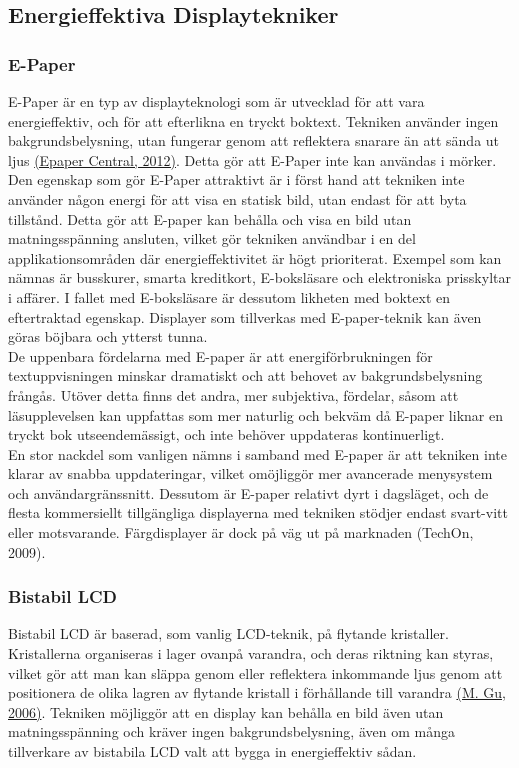 \documentclass[a4paper,11pt]{article}
\begin{document}
\subsection{Energieffektiva Displaytekniker}

\subsubsection{E-Paper}
E-Paper är en typ av displayteknologi som är utvecklad för att vara energieffektiv, och för att efterlikna en tryckt boktext. Tekniken använder ingen bakgrundsbelysning, utan fungerar genom att reflektera snarare än att sända ut ljus \hyperref[epapercentral]{(Epaper Central, 2012)}. Detta gör att E-Paper inte kan användas i mörker. Den egenskap som gör E-Paper attraktivt är i först hand att tekniken inte använder någon energi för att visa en statisk bild, utan endast för att byta tillstånd. Detta gör att E-paper kan behålla och visa en bild utan matningsspänning ansluten, vilket gör tekniken användbar i en del applikationsområden där energieffektivitet är högt prioriterat. Exempel som kan nämnas är busskurer, smarta kreditkort, E-boksläsare och elektroniska prisskyltar i affärer. I fallet med E-boksläsare är dessutom likheten med boktext en eftertraktad egenskap. Displayer som tillverkas med E-paper-teknik kan även göras böjbara och ytterst tunna. \\

De uppenbara fördelarna med E-paper är att energiförbrukningen för textuppvisningen minskar dramatiskt och att behovet av bakgrundsbelysning frångås. Utöver detta finns det andra, mer subjektiva, fördelar, såsom att läsupplevelsen kan uppfattas som mer naturlig och bekväm då E-paper liknar en tryckt bok utseendemässigt, och inte behöver uppdateras kontinuerligt. \\

En stor nackdel som vanligen nämns i samband med E-paper är att tekniken inte klarar av snabba uppdateringar, vilket omöjliggör mer avancerade menysystem och användargränssnitt. Dessutom är E-paper relativt dyrt i dagsläget, och de flesta kommersiellt tillgängliga displayerna med tekniken stödjer endast svart-vitt eller motsvarande. Färgdisplayer är dock på väg ut på marknaden (TechOn, 2009).

\subsubsection{Bistabil LCD}
Bistabil LCD är baserad, som vanlig LCD-teknik, på flytande kristaller. Kristallerna organiseras i lager ovanpå varandra, och deras riktning kan styras, vilket gör att man kan släppa genom eller reflektera inkommande ljus genom att positionera de olika lagren av flytande kristall i förhållande till varandra \hyperref[mingu]{(M. Gu, 2006)}. Tekniken möjliggör att en display kan behålla en bild även utan matningsspänning och kräver ingen bakgrundsbelysning, även om många tillverkare av bistabila LCD valt att bygga in energieffektiv sådan.\\
\end{document}
